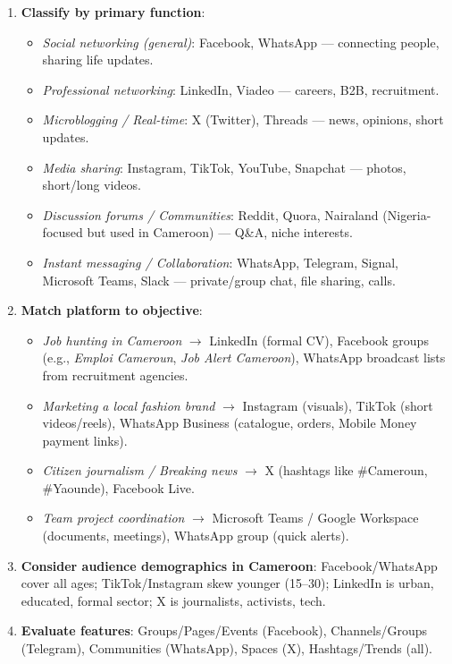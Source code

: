\documentclass[11pt]{article}
\begin{document}
\begin{methode}
\begin{enumerate}
    \item \textbf{Classify by primary function}:
          \begin{itemize}
              \item \textit{Social networking (general)}: Facebook, WhatsApp — connecting people, sharing life updates.
              \item \textit{Professional networking}: LinkedIn, Viadeo — careers, B2B, recruitment.
              \item \textit{Microblogging / Real-time}: X (Twitter), Threads — news, opinions, short updates.
              \item \textit{Media sharing}: Instagram, TikTok, YouTube, Snapchat — photos, short/long videos.
              \item \textit{Discussion forums / Communities}: Reddit, Quora, Nairaland (Nigeria-focused but used in Cameroon) — Q\&A, niche interests.
              \item \textit{Instant messaging / Collaboration}: WhatsApp, Telegram, Signal, Microsoft Teams, Slack — private/group chat, file sharing, calls.
          \end{itemize}
    \item \textbf{Match platform to objective}:
          \begin{itemize}
              \item \textit{Job hunting in Cameroon} $\rightarrow$ LinkedIn (formal CV), Facebook groups (e.g., \textit{Emploi Cameroun}, \textit{Job Alert Cameroon}), WhatsApp broadcast lists from recruitment agencies.
              \item \textit{Marketing a local fashion brand} $\rightarrow$ Instagram (visuals), TikTok (short videos/reels), WhatsApp Business (catalogue, orders, Mobile Money payment links).
              \item \textit{Citizen journalism / Breaking news} $\rightarrow$ X (hashtags like \#Cameroun, \#Yaounde), Facebook Live.
              \item \textit{Team project coordination} $\rightarrow$ Microsoft Teams / Google Workspace (documents, meetings), WhatsApp group (quick alerts).
          \end{itemize}
    \item \textbf{Consider audience demographics in Cameroon}: Facebook/WhatsApp cover all ages; TikTok/Instagram skew younger (15–30); LinkedIn is urban, educated, formal sector; X is journalists, activists, tech.
    \item \textbf{Evaluate features}: Groups/Pages/Events (Facebook), Channels/Groups (Telegram), Communities (WhatsApp), Spaces (X), Hashtags/Trends (all).
\end{enumerate}
\end{methode}
\end{document}
